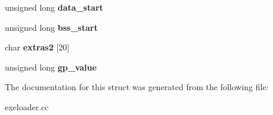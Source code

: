 \begin{DoxyCompactItemize}
\item 
\hypertarget{structcoff__file__header_af8bf75aa92cf4079ba45a46d7c0d3b1c}{
unsigned long {\bfseries data\_\-start}}
\label{structcoff__file__header_af8bf75aa92cf4079ba45a46d7c0d3b1c}

\item 
\hypertarget{structcoff__file__header_ac7557f85ac4733028073dcdcab1e99a4}{
unsigned long {\bfseries bss\_\-start}}
\label{structcoff__file__header_ac7557f85ac4733028073dcdcab1e99a4}

\item 
\hypertarget{structcoff__file__header_a193e5699d76f0b4243bf268c9edae8df}{
char {\bfseries extras2} \mbox{[}20\mbox{]}}
\label{structcoff__file__header_a193e5699d76f0b4243bf268c9edae8df}

\item 
\hypertarget{structcoff__file__header_a103cd7f2a0cbc1134b930a5f5b84a82a}{
unsigned long {\bfseries gp\_\-value}}
\label{structcoff__file__header_a103cd7f2a0cbc1134b930a5f5b84a82a}

\end{DoxyCompactItemize}


The documentation for this struct was generated from the following file:\begin{DoxyCompactItemize}
\item 
exeloader.cc\end{DoxyCompactItemize}
